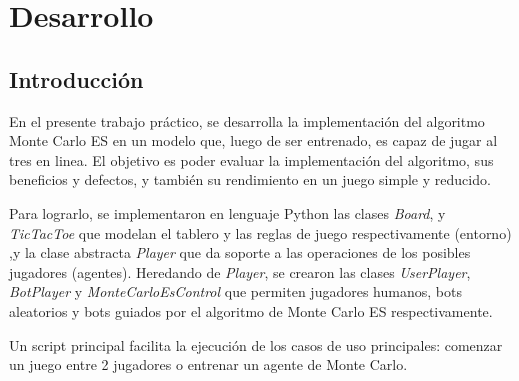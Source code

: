 
\chapter{Desarrollo} %

\label{Chapter1} %
\label{IntroGeneral}


\newcommand{\keyword}[1]{\textbf{#1}}
\newcommand{\tabhead}[1]{\textbf{#1}}
\newcommand{\code}[1]{\texttt{#1}}
\newcommand{\file}[1]{\texttt{\bfseries#1}}
\newcommand{\option}[1]{\texttt{\itshape#1}}
\newcommand{\grados}{$^{\circ}$}



\section{Introducción}

En el presente trabajo práctico, se desarrolla la implementación del algoritmo Monte Carlo ES en un modelo que, luego de ser entrenado, es capaz de jugar al tres en linea. El objetivo es poder evaluar la implementación del algoritmo, sus beneficios y defectos, y también su rendimiento en un juego simple y reducido.

Para lograrlo, se implementaron en lenguaje Python las clases \textit{Board}, y \textit{TicTacToe} que modelan el tablero y las reglas de juego respectivamente (entorno) ,y la clase abstracta \textit{Player} que da soporte a las operaciones de los posibles jugadores (agentes). Heredando de \textit{Player}, se crearon las clases \textit{UserPlayer}, \textit{BotPlayer} y  \textit{MonteCarloEsControl} que permiten jugadores humanos, bots aleatorios y bots guiados por el algoritmo de Monte Carlo ES respectivamente.

Un script principal facilita la ejecución de los casos de uso principales: comenzar un juego entre 2 jugadores o entrenar un agente de Monte Carlo.

